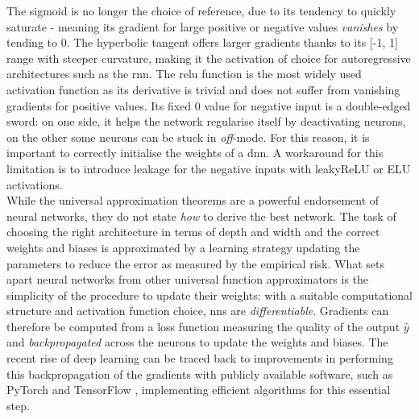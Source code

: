 The sigmoid is no longer the choice of reference, due to its tendency to quickly saturate - meaning its gradient for large positive or negative values \textit{vanishes} by tending to 0. The hyperbolic tangent offers larger gradients thanks to its [-1, 1] range with steeper curvature, making it the activation of choice for autoregressive architectures such as the \gls{rnn}. The \gls{relu} function is the most widely used activation function as its derivative is trivial and does not suffer from vanishing gradients for positive values. Its fixed 0 value for negative input is a double-edged sword: on one side, it helps the network regularise itself by deactivating neurons, on the other some neurons can be stuck in \textit{off}-mode. For this reason, it is important to correctly initialise the weights of a \gls{dnn}. A workaround for this limitation is to introduce leakage for the negative inputs with leakyReLU or ELU activations.\\

While the universal approximation theorems are a powerful endorsement of neural networks, they do not state \textit{how} to derive the best network. The task of choosing the right architecture in terms of depth and width and the correct weights and biases is approximated by a learning strategy updating the parameters to reduce the error as measured by the empirical risk. What sets apart neural networks from other universal function approximators is the simplicity of the procedure to update their weights: with a suitable computational structure and activation function choice, \glspl{nn} are \textit{differentiable}. Gradients can therefore be computed from a loss function measuring the quality of the output $\hat{y}$ and \textit{backpropagated} across the neurons to update the weights and biases. The recent rise of deep learning can be traced back to improvements in performing this backpropagation of the gradients with publicly available software, such as PyTorch \cite{pytorch} and TensorFlow \cite{tensorflow2015-whitepaper}, implementing efficient algorithms for this essential step. \\

